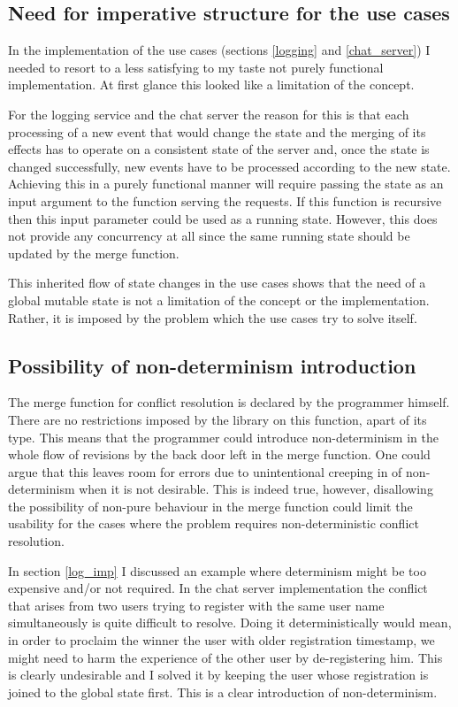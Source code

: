 \documentclass[12pt,twoside,notitlepage]{report}
\begin{document}
\subsection{Need for imperative structure for the use cases}
\label{eval_imp}
In the implementation of the use cases (sections \ref{logging} and \ref{chat_server}) I needed to resort to a less satisfying to my taste not purely functional implementation. At first glance this looked like a limitation of the concept.

For the logging service and the chat server the reason for this is that each processing of a new event that would change the state and the merging of its effects has to operate on a consistent state of the server and, once the state is changed successfully, new events have to be processed according to the new state. Achieving this in a purely functional manner will require passing the state as an input argument to the function serving the requests. If this function is recursive then this input parameter could be used as a running state. However, this does not provide any concurrency at all since the same running state should be updated by the merge function.

This inherited flow of state changes in the use cases shows that the need of a global mutable state is not a limitation of the concept or the implementation. Rather, it is imposed by the problem which the use cases try to solve itself.  

\subsection{Possibility of non-determinism introduction}
\label{eval_nondet}
The merge function for conflict resolution is declared by the programmer himself. There are no restrictions imposed by the library on this function, apart of its type. This means that the programmer could introduce non-determinism in the whole flow of revisions by the back door left in the merge function. One could argue that this leaves room for errors due to unintentional creeping in of non-determinism when it is not desirable. This is indeed true, however, disallowing the possibility of non-pure behaviour in the merge function could limit the usability for the cases where the problem requires non-deterministic conflict resolution.
  
In section \ref{log_imp} I discussed an example where determinism might be too expensive and/or not required. In the chat server implementation the conflict that arises from two users trying to register with the same user name simultaneously is quite difficult to resolve. Doing it deterministically would mean, in order to proclaim the winner the user with older registration timestamp,  we might need to harm the experience of the other user by de-registering him. This is clearly undesirable and I solved it by keeping the user whose registration is joined to the global state first. This is a clear introduction of non-determinism. 
\end{document}
